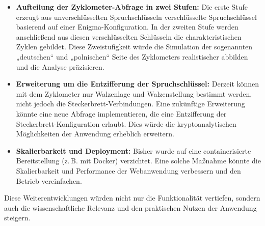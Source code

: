 \documentclass[12pt, ngerman, a4paper, numbers=noenddot]{article}
\begin{document}
\begin{itemize}
	\item \textbf{Aufteilung der Zyklometer-Abfrage in zwei Stufen:}  
	Die erste Stufe erzeugt aus unverschlüsselten Spruchschlüsseln verschlüsselte Spruchschlüssel basierend auf einer Enigma-Konfiguration. In der zweiten Stufe werden anschließend aus diesen verschlüsselten Schlüsseln die charakteristischen Zyklen gebildet. Diese Zweistufigkeit würde die Simulation der sogenannten „deutschen“ und „polnischen“ Seite des Zyklometers realistischer abbilden und die Analyse präzisieren.
	
	\item \textbf{Erweiterung um die Entzifferung der Spruchschlüssel:}  
	Derzeit können mit dem Zyklometer nur Walzenlage und Walzenstellung bestimmt werden, nicht jedoch die Steckerbrett-Verbindungen. Eine zukünftige Erweiterung könnte eine neue Abfrage implementieren, die eine Entzifferung der Steckerbrett-Konfiguration erlaubt. Dies würde die kryptoanalytischen Möglichkeiten der Anwendung erheblich erweitern.
	
	\item \textbf{Skalierbarkeit und Deployment:}  
	Bisher wurde auf eine containerisierte Bereitstellung (z.\,B. mit Docker) verzichtet. Eine solche Maßnahme könnte die Skalierbarkeit und Performance der Webanwendung verbessern und den Betrieb vereinfachen.
\end{itemize}

Diese Weiterentwicklungen würden nicht nur die Funktionalität vertiefen, sondern auch die wissenschaftliche Relevanz und den praktischen Nutzen der Anwendung steigern.
\end{document}
